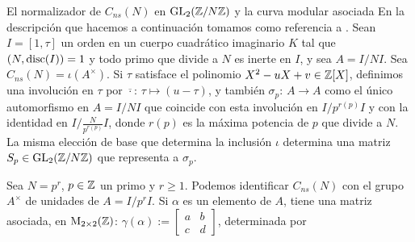 \begin{subsection}{El normalizador de $C_{ns}(N)$ en $\GL{2}(\bb{Z}/N\bb{Z})$ %
		y la curva modular asociada}\label{subsec:normalizadorYCurva}
En la descripci\'{o}n que hacemos a continuaci\'{o}n tomamos como referencia a
\cite{baranNormalizers}.
Sean $I=[1,\tau]$ un orden en un cuerpo cuadr\'{a}tico imaginario $K$ tal que
$(N,\rm{disc}(I))=1$ y todo primo que divide a $N$ es inerte en $I$, y sea %
$A=I/NI$. Sea $C_{ns}(N)=\iota(A^{\times})$. Si $\tau$ %
satisface el polinomio $X^{2}-uX+v\in\bb{Z}[X]$, definimos una involuci\'{o}n
en $\tau$ por $\overline{\cdot}:\,\tau\mapsto(u-\tau)$, y tambi\'{e}n
$\sigma_{p}:\,A\rightarrow A$ como el \'{u}nico automorfismo en $A=I/NI$ que
coincide con esta involuci\'{o}n en $I/p^{r(p)}I$ y con la identidad en
$I/\frac{N}{p^{r(p)}}I$, donde $r(p)$ es la m\'{a}xima potencia de $p$ que divide
a $N$. La misma elecci\'{o}n de base que determina la
inclusi\'{o}n $\iota$ determina una matriz $S_{p}\in\GL{2}(\bb{Z}/N\bb{Z})$
que representa a $\sigma_{p}$.

Sea $N=p^{r}$, $p\in\bb{Z}$ un primo y $r\geq 1$. Podemos identificar $C_{ns}(N)$
con el grupo $A^{\times}$ de unidades de $A=I/p^{r}I$. Si $\alpha$ es un elemento
de $A$, tiene una matriz asociada, en $\MM{2}(\bb{Z})$:
\begin{math}
 \gamma(\alpha):=
 \left[\begin{smallmatrix}a&b\\c&d\end{smallmatrix}\right]
\end{math},
determinada por


\end{subsection}
